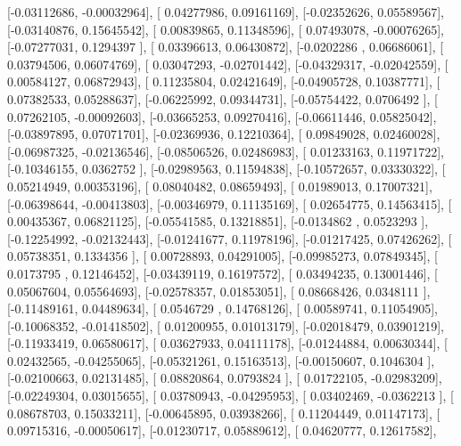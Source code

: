 \documentclass{article}
\begin{document}
       [-0.03112686, -0.00032964],
       [ 0.04277986,  0.09161169],
       [-0.02352626,  0.05589567],
       [-0.03140876,  0.15645542],
       [ 0.00839865,  0.11348596],
       [ 0.07493078, -0.00076265],
       [-0.07277031,  0.1294397 ],
       [ 0.03396613,  0.06430872],
       [-0.0202286 ,  0.06686061],
       [ 0.03794506,  0.06074769],
       [ 0.03047293, -0.02701442],
       [-0.04329317, -0.02042559],
       [ 0.00584127,  0.06872943],
       [ 0.11235804,  0.02421649],
       [-0.04905728,  0.10387771],
       [ 0.07382533,  0.05288637],
       [-0.06225992,  0.09344731],
       [-0.05754422,  0.0706492 ],
       [ 0.07262105, -0.00092603],
       [-0.03665253,  0.09270416],
       [-0.06611446,  0.05825042],
       [-0.03897895,  0.07071701],
       [-0.02369936,  0.12210364],
       [ 0.09849028,  0.02460028],
       [-0.06987325, -0.02136546],
       [-0.08506526,  0.02486983],
       [ 0.01233163,  0.11971722],
       [-0.10346155,  0.0362752 ],
       [-0.02989563,  0.11594838],
       [-0.10572657,  0.03330322],
       [ 0.05214949,  0.00353196],
       [ 0.08040482,  0.08659493],
       [ 0.01989013,  0.17007321],
       [-0.06398644, -0.00413803],
       [-0.00346979,  0.11135169],
       [ 0.02654775,  0.14563415],
       [ 0.00435367,  0.06821125],
       [-0.05541585,  0.13218851],
       [-0.0134862 ,  0.0523293 ],
       [-0.12254992, -0.02132443],
       [-0.01241677,  0.11978196],
       [-0.01217425,  0.07426262],
       [ 0.05738351,  0.1334356 ],
       [ 0.00728893,  0.04291005],
       [-0.09985273,  0.07849345],
       [ 0.0173795 ,  0.12146452],
       [-0.03439119,  0.16197572],
       [ 0.03494235,  0.13001446],
       [ 0.05067604,  0.05564693],
       [-0.02578357,  0.01853051],
       [ 0.08668426,  0.0348111 ],
       [-0.11489161,  0.04489634],
       [ 0.0546729 ,  0.14768126],
       [ 0.00589741,  0.11054905],
       [-0.10068352, -0.01418502],
       [ 0.01200955,  0.01013179],
       [-0.02018479,  0.03901219],
       [-0.11933419,  0.06580617],
       [ 0.03627933,  0.04111178],
       [-0.01244884,  0.00630344],
       [ 0.02432565, -0.04255065],
       [-0.05321261,  0.15163513],
       [-0.00150607,  0.1046304 ],
       [-0.02100663,  0.02131485],
       [ 0.08820864,  0.0793824 ],
       [ 0.01722105, -0.02983209],
       [-0.02249304,  0.03015655],
       [ 0.03780943, -0.04295953],
       [ 0.03402469, -0.0362213 ],
       [ 0.08678703,  0.15033211],
       [-0.00645895,  0.03938266],
       [ 0.11204449,  0.01147173],
       [ 0.09715316, -0.00050617],
       [-0.01230717,  0.05889612],
       [ 0.04620777,  0.12617582],
\end{document}
